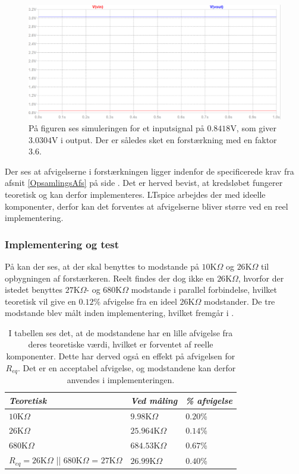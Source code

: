 \begin{figure}[H]
	\centering
	\includegraphics[scale=0.42]{figures/cProblemloesning/Forstaerker_faktor3_simulering.PNG}
	\caption{På figuren ses simuleringen for et inputsignal på $0.8418$V, som giver $3.0304$V i output. Der er således sket en forstærkning med en faktor $3.6$.}
	\label{fig:faktor3_simulering}
\end{figure}
\noindent Der ses at afvigelserne i  forstærkningen ligger indenfor de specificerede krav fra afsnit \ref{OpsamlingsAfs} på side \pageref{OpsamlingsAfs}. Det er herved bevist, at kredsløbet fungerer teoretisk og kan derfor implementeres. LTspice arbejdes der med ideelle komponenter, derfor kan det forventes at afvigelserne bliver større ved en reel implementering. 

\subsubsection{Implementering og test}
På  kan der ses, at der skal benyttes to modstande på $10$K$\Omega$ og $26$K$\Omega$ til opbygningen af forstærkeren. Reelt findes der dog ikke en $26$K$\Omega$, hvorfor der istedet benyttes $27$K$\Omega$- og $680$K$\Omega$ modstande i parallel forbindelse, hvilket teoretisk vil give en $0.12$\% afvigelse fra en ideel $26$K$\Omega$ modstander. De tre modstande blev målt inden implementering, hvilket fremgår i .
\begin{table}[H]
	\centering
	\begin{tabular}{|l|l|l|}
		\hline
		\textit{Teoretisk}  & \textit{Ved måling} & \textit{\% afvigelse} \\ \hline
		$10$K$\Omega$       & $9.98$K$\Omega$     & $0.20$\%               \\ \hline
		$26$K$\Omega$      &  $25.964$K$\Omega$   & $0.14$\% \\ \hline
		$680$K$\Omega$      & $684.53$K$\Omega$   & $0.67$\%               \\ \hline
$R_{eq} = 26$K$\Omega$ || $680$K$\Omega$ = $27$K$\Omega$       & $26.99$K$\Omega$    & $0.40$\%               \\ \hline
	\end{tabular}
	\caption{I tabellen ses det, at de modstandene har en lille afvigelse fra deres teoretiske værdi, hvilket er forventet af reelle komponenter. Dette har derved også en effekt på afvigelsen for $R_{eq}$. Det er en acceptabel afvigelse, og modstandene kan derfor anvendes i implementeringen.}
	\label{Tab:modstand_faktor18}
\end{table}


